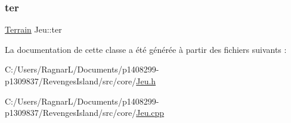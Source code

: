 \mbox{\label{class_jeu_a6ef0d2feb24c59b28fe08059057e96ff}} 
\subsubsection{\texorpdfstring{ter}{ter}}
{\footnotesize\ttfamily \hyperlink{class_terrain}{Terrain} Jeu\+::ter\hspace{0.3cm}{\ttfamily [private]}}



La documentation de cette classe a été générée à partir des fichiers suivants \+:\begin{DoxyCompactItemize}
\item 
C\+:/\+Users/\+Ragnar\+L/\+Documents/p1408299-\/p1309837/\+Revenges\+Island/src/core/\hyperlink{_jeu_8h}{Jeu.\+h}\item 
C\+:/\+Users/\+Ragnar\+L/\+Documents/p1408299-\/p1309837/\+Revenges\+Island/src/core/\hyperlink{_jeu_8cpp}{Jeu.\+cpp}\end{DoxyCompactItemize}

